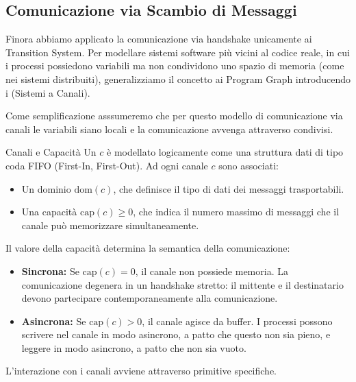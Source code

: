 \subsection{Comunicazione via Scambio di Messaggi}

Finora abbiamo applicato la comunicazione via handshake unicamente ai Transition System. Per modellare sistemi software più vicini al codice reale, in cui i processi possiedono variabili ma non condividono uno spazio di memoria (come nei sistemi distribuiti), generalizziamo il concetto ai Program Graph introducendo i  (Sistemi a Canali).

Come semplificazione asssumeremo che per questo modello di comunicazione via canali le variabili siano locali e la comunicazione avvenga attraverso  condivisi.

\begin{definition}{Canali e Capacità}
  Un  \(c\) è modellato logicamente come una struttura dati di tipo coda FIFO (First-In, First-Out). Ad ogni canale \(c\) sono associati:
  \begin{itemize}
    \item Un dominio \(\text{dom}(c)\), che definisce il tipo di dati dei messaggi trasportabili.
    \item Una capacità \(\text{cap}(c) \ge 0\), che indica il numero massimo di messaggi che il canale può memorizzare simultaneamente.
  \end{itemize}

  Il valore della capacità determina la semantica della comunicazione:
  \begin{itemize}
    \item \textbf{Sincrona:} Se \(\text{cap}(c) = 0\), il canale non possiede memoria. La comunicazione degenera in un handshake stretto: il mittente e il destinatario devono partecipare contemporaneamente alla comunicazione.
    \item \textbf{Asincrona:} Se \(\text{cap}(c) > 0\), il canale agisce da buffer. I processi possono scrivere nel canale in modo asincrono, a patto che questo non sia pieno, e leggere in modo asincrono, a patto che non sia vuoto.
  \end{itemize}
\end{definition}

L'interazione con i canali avviene attraverso primitive specifiche.


